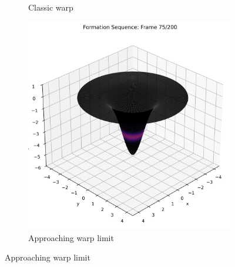\documentclass[12pt]{article}
\begin{document}
\begin{figure}[H]
\begin{subfigure}[b]{0.3\textwidth}
    \caption{Classic warp}
  \end{subfigure}
  \hfill
  \begin{subfigure}[b]{0.3\textwidth}
    \includegraphics[width=\textwidth]{frame_075.png}
    \caption{Approaching warp limit}
  \end{subfigure}

  \par\vspace{0.5em}


\end{figure}
\end{document}
